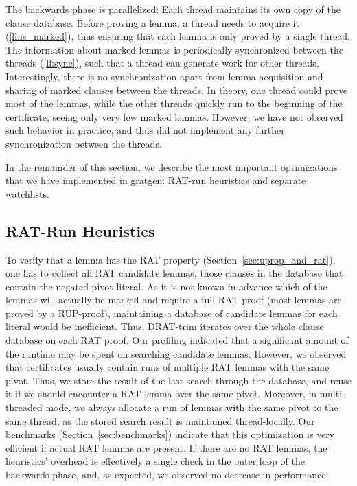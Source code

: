 \documentclass[smallcondensed]{svjour3}     %
\begin{document}
The backwards phase is parallelized: Each thread maintains its own copy of the clause database. 
Before proving a lemma, a thread needs to acquire it (\ref{ll:is_marked}), thus ensuring that each lemma is only proved by a single thread.
The information about marked lemmas is periodically synchronized between the threads (\ref{ll:sync}), such that a thread can generate work for other threads.
Interestingly, there is no synchronization apart from lemma acquisition and sharing of marked clauses between the 
threads. In theory, one thread could prove most of the lemmas, while the other threads quickly run to the beginning of the certificate, 
seeing only very few marked lemmas. However, we have not observed such behavior in practice, and thus did not implement any further synchronization
between the threads.

In the remainder of this section, we describe the most important optimizations that we have implemented in gratgen: RAT-run heuristics and separate watchlists.

\subsection{RAT-Run Heuristics}
To verify that a lemma has the RAT property (\cf Section~\ref{sec:uprop_and_rat}), one has to collect all RAT candidate lemmas, \ie those clauses in the 
database that contain the negated pivot literal. As it is not known in advance which of the lemmas will
actually be marked and require a full RAT proof (most lemmas are proved by a RUP-proof), maintaining a database of candidate 
lemmas for each literal would be inefficient. Thus, DRAT-trim iterates over the whole clause database on each RAT proof. Our profiling indicated that a significant amount of the runtime may be spent on searching candidate lemmas. However, we observed that certificates
usually contain runs of multiple RAT lemmas with the same pivot. Thus, we store the result of the last search through the database, and reuse it if 
we should encounter a RAT lemma over the same pivot. Moreover, in multi-threaded mode, we always allocate a run of lemmas with the same pivot to the 
same thread, as the stored search result is maintained thread-locally. Our benchmarks (Section~\ref{sec:benchmarks}) indicate that this optimization is very efficient if actual RAT lemmas are present. If there are no RAT lemmas, the heuristics' overhead is effectively a single check in the outer loop
of the backwards phase, and, as expected, we observed no decrease in performance.
\end{document}
